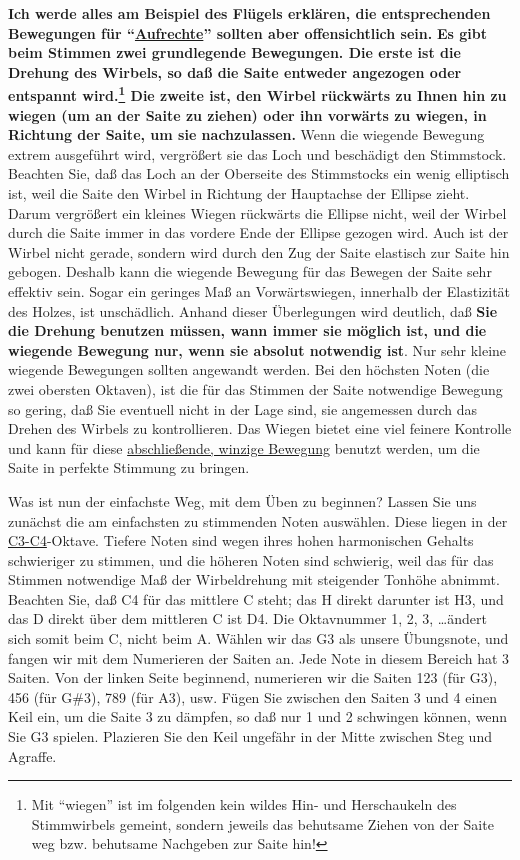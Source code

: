 \textbf{Ich werde alles am Beispiel des Flügels erklären, die entsprechenden Bewegungen für \enquote{\hyperref[upright]{Aufrechte}} sollten aber offensichtlich sein.}
\textbf{Es gibt beim Stimmen zwei grundlegende Bewegungen.
Die erste ist die Drehung des Wirbels, so daß die Saite entweder angezogen oder entspannt wird.\footnote{Mit \enquote{wiegen} ist im folgenden kein wildes Hin- und Herschaukeln des Stimmwirbels gemeint, sondern jeweils das behutsame Ziehen von der Saite weg bzw. behutsame Nachgeben zur Saite hin!}
Die zweite ist, den Wirbel rückwärts zu Ihnen hin zu wiegen (um an der Saite zu ziehen) oder ihn vorwärts zu wiegen, in Richtung der Saite, um sie nachzulassen.}
Wenn die wiegende Bewegung extrem ausgeführt wird, vergrößert sie das Loch und beschädigt den Stimmstock.
Beachten Sie, daß das Loch an der Oberseite des Stimmstocks ein wenig elliptisch ist, weil die Saite den Wirbel in Richtung der Hauptachse der Ellipse zieht.
Darum vergrößert ein kleines Wiegen rückwärts die Ellipse nicht, weil der Wirbel durch die Saite immer in das vordere Ende der Ellipse gezogen wird.
Auch ist der Wirbel nicht gerade, sondern wird durch den Zug der Saite elastisch zur Saite hin gebogen.
Deshalb kann die wiegende Bewegung für das Bewegen der Saite sehr effektiv sein.
Sogar ein geringes Maß an Vorwärtswiegen, innerhalb der Elastizität des Holzes, ist unschädlich.
Anhand dieser Überlegungen wird deutlich, daß \textbf{Sie die Drehung benutzen müssen, wann immer sie möglich ist, und die wiegende Bewegung nur, wenn sie absolut notwendig ist}.
Nur sehr kleine wiegende Bewegungen sollten angewandt werden.
Bei den höchsten Noten (die zwei obersten Oktaven), ist die für das Stimmen der Saite notwendige Bewegung so gering, daß Sie eventuell nicht in der Lage sind, sie angemessen durch das Drehen des Wirbels zu kontrollieren.
Das Wiegen bietet eine viel feinere Kontrolle und kann für diese \hyperref[c2_5_infi]{abschließende, winzige Bewegung} benutzt werden, um die Saite in perfekte Stimmung zu bringen.

Was ist nun der einfachste Weg, mit dem Üben zu beginnen?
Lassen Sie uns zunächst die am einfachsten zu stimmenden Noten auswählen.
Diese liegen in der \hyperref[Noten]{C3-C4}-Oktave.
Tiefere Noten sind wegen ihres hohen harmonischen Gehalts schwieriger zu stimmen, und die höheren Noten sind schwierig, weil das für das Stimmen notwendige Maß der Wirbeldrehung mit steigender Tonhöhe abnimmt.
Beachten Sie, daß C4 für das mittlere C steht; das H direkt darunter ist H3, und das D direkt über dem mittleren C ist D4.
Die Oktavnummer 1, 2, 3, \dots ändert sich somit beim C, nicht beim A.
Wählen wir das G3 als unsere Übungsnote, und fangen wir mit dem Numerieren der Saiten an.
Jede Note in diesem Bereich hat 3 Saiten.
Von der linken Seite beginnend, numerieren wir die Saiten 123 (für G3), 456 (für G\#3), 789 (für A3), usw.
Fügen Sie zwischen den Saiten 3 und 4 einen Keil ein, um die Saite 3 zu dämpfen, so daß nur 1 und 2 schwingen können, wenn Sie G3 spielen.
Plazieren Sie den Keil ungefähr in der Mitte zwischen Steg und Agraffe.

